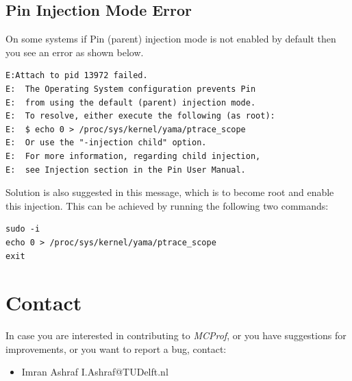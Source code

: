 \documentclass[10pt]{article}
\newcommand{\MCPROF}{\emph{MCProf}}
\begin{document}
\subsection{Pin Injection Mode Error}

On some systems if Pin (parent) injection mode is not enabled by default then
you see an error as shown below.

{
\small
\begin{Verbatim}[frame=single, samepage=true]
E:Attach to pid 13972 failed. 
E:  The Operating System configuration prevents Pin
E:  from using the default (parent) injection mode.
E:  To resolve, either execute the following (as root):
E:  $ echo 0 > /proc/sys/kernel/yama/ptrace_scope
E:  Or use the "-injection child" option.
E:  For more information, regarding child injection,
E:  see Injection section in the Pin User Manual.
\end{Verbatim}
}

Solution is also suggested in this message, which is to become root and enable
this injection. This can be achieved by running the following two commands:

{
\small
\begin{Verbatim}[frame=single, samepage=true]
sudo -i
echo 0 > /proc/sys/kernel/yama/ptrace_scope
exit
\end{Verbatim}
}


\section{Contact}
\label{sec:contact}

In case you are interested in contributing to \MCPROF{}, or you have suggestions
for improvements, or you want to report a bug, contact:

\begin{itemize}
\item Imran Ashraf \textlangle I.Ashraf@TUDelft.nl \textrangle
\end{itemize}




\end{document}
